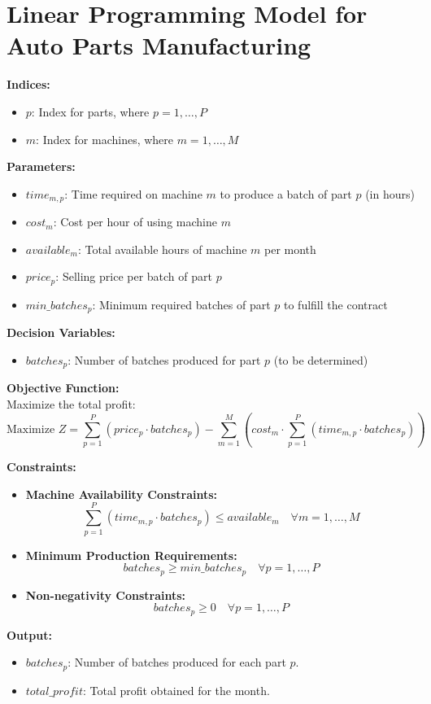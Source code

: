 \documentclass{article}
\begin{document}
\section*{Linear Programming Model for Auto Parts Manufacturing}

\textbf{Indices:}
\begin{itemize}
    \item $p$: Index for parts, where $p = 1, \ldots, P$
    \item $m$: Index for machines, where $m = 1, \ldots, M$
\end{itemize}

\textbf{Parameters:}
\begin{itemize}
    \item $time_{m,p}$: Time required on machine $m$ to produce a batch of part $p$ (in hours)
    \item $cost_{m}$: Cost per hour of using machine $m$
    \item $available_{m}$: Total available hours of machine $m$ per month
    \item $price_{p}$: Selling price per batch of part $p$
    \item $min\_batches_{p}$: Minimum required batches of part $p$ to fulfill the contract
\end{itemize}

\textbf{Decision Variables:}
\begin{itemize}
    \item $batches_{p}$: Number of batches produced for part $p$ (to be determined)
\end{itemize}

\textbf{Objective Function:} \\
Maximize the total profit:
\[
\text{Maximize } Z = \sum_{p=1}^{P} (price_{p} \cdot batches_{p}) - \sum_{m=1}^{M} \left( cost_{m} \cdot \sum_{p=1}^{P} (time_{m,p} \cdot batches_{p}) \right)
\]

\textbf{Constraints:}
\begin{itemize}
    \item \textbf{Machine Availability Constraints:}
    \[
    \sum_{p=1}^{P} (time_{m,p} \cdot batches_{p}) \leq available_{m} \quad \forall m = 1, \ldots, M
    \]
    \item \textbf{Minimum Production Requirements:}
    \[
    batches_{p} \geq min\_batches_{p} \quad \forall p = 1, \ldots, P
    \]
    \item \textbf{Non-negativity Constraints:}
    \[
    batches_{p} \geq 0 \quad \forall p = 1, \ldots, P
    \]
\end{itemize}

\textbf{Output:}
\begin{itemize}
    \item $batches_{p}$: Number of batches produced for each part $p$.
    \item $total\_profit$: Total profit obtained for the month.
\end{itemize}
\end{document}
